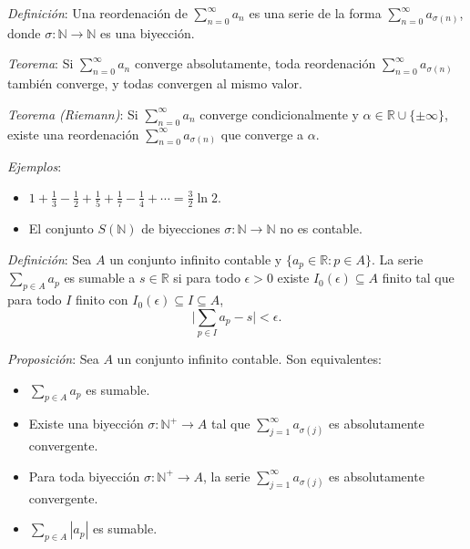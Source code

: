 \documentclass{beamer}
\begin{document}
  \begin{frame}
    \textit{Definición}: Una reordenación de $\sum_{n=0}^{\infty} a_n$ es una serie
    de la forma $\sum_{n=0}^{\infty} a_{\sigma(n)}$, donde
    $\sigma: \mathbb{N} \to \mathbb{N}$ es una biyección.
    \newline\newline
    \pause

    \textit{Teorema}: Si $\sum_{n=0}^{\infty} a_n$ converge absolutamente, toda
    reordenación $\sum_{n=0}^{\infty} a_{\sigma(n)}$ también converge, y todas
    convergen al mismo valor.
    \newline\newline
    \pause

    \textit{Teorema (Riemann)}: Si $\sum_{n=0}^{\infty} a_n$ converge
    condicionalmente y $\alpha \in \mathbb{R} \cup \{\pm\infty\}$, existe una
    reordenación $\sum_{n=0}^{\infty} a_{\sigma(n)}$ que converge a $\alpha$.
    \newline\newline
    \pause

    \textit{Ejemplos}:
    \begin{itemize}[<+->]
      \item $1 + \frac{1}{3} - \frac{1}{2} + \frac{1}{5} + \frac{1}{7} - \frac{1}{4} + \cdots = \frac{3}{2} \ln 2$.
      \item El conjunto $S(\mathbb{N})$ de biyecciones $\sigma: \mathbb{N} \to \mathbb{N}$
        no es contable.
    \end{itemize}
  \end{frame}

  \begin{frame}
    \textit{Definición}: Sea $A$ un conjunto infinito contable y
    $\{a_p \in \mathbb{R} : p \in A\}$. La serie $\sum_{p \in A} a_p$ es sumable a
    $s \in \mathbb{R}$ si para todo $\epsilon > 0$ existe $I_0(\epsilon) \subseteq A$
    finito tal que para todo $I$ finito con $I_0(\epsilon) \subseteq I \subseteq A$,
    \[
      \Big| \sum_{p \in I} a_p - s \Big| < \epsilon.
    \]
    \pause

    \textit{Proposición}: Sea $A$ un conjunto infinito contable. Son equivalentes:
    \begin{itemize}[<+->]
      \item $\sum_{p \in A} a_p$ es sumable.
      \item Existe una biyección $\sigma: \mathbb{N}^+ \to A$ tal que
        $\sum_{j=1}^{\infty} a_{\sigma(j)}$ es absolutamente convergente.
      \item Para toda biyección $\sigma: \mathbb{N}^+ \to A$, la serie
        $\sum_{j=1}^{\infty} a_{\sigma(j)}$ es absolutamente convergente.
      \item $\sum_{p \in A} |a_p|$ es sumable.
    \end{itemize}
  \end{frame}
\end{document}
